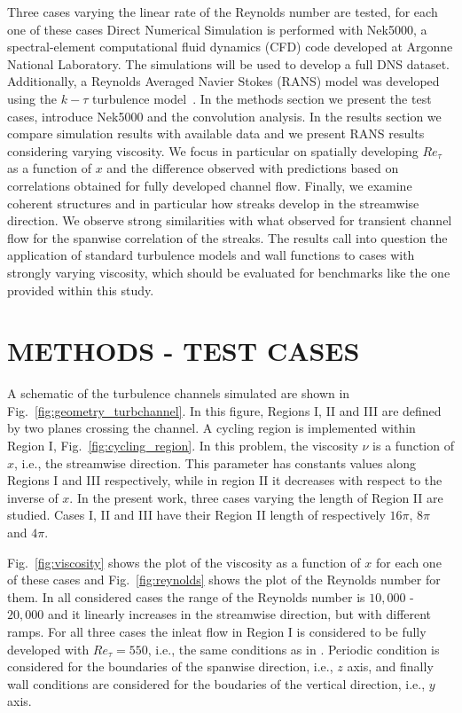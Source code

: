 \documentclass[twocolumn,10pt]{asme2e}
\begin{document}
Three cases varying the linear rate of the Reynolds number are tested, for each one of these cases Direct Numerical Simulation is performed with Nek5000, a spectral-element computational fluid dynamics (CFD) code developed at Argonne National Laboratory. The simulations will be used to develop a full DNS dataset. Additionally, a Reynolds Averaged Navier Stokes (RANS) model was developed using the \(k-\tau\) turbulence model~\cite{speziale1992}. In the methods section we present the test cases, introduce Nek5000 and the convolution analysis. In the results section we compare simulation results with available data and we present RANS results considering varying viscosity. We focus in particular on spatially developing $Re_{\tau}$ as a function of $x$ and the difference observed with predictions based on correlations obtained for fully developed channel flow. Finally, we examine coherent structures and in particular how streaks develop in the streamwise direction. We observe strong similarities with what observed for transient channel flow for the spanwise correlation of the streaks. The results call into question the application of standard turbulence models and wall functions to cases with strongly varying viscosity, which should be evaluated for benchmarks like the one provided within this study.


\section*{METHODS - TEST CASES}

A schematic of the turbulence channels simulated are shown in Fig.~\ref{fig:geometry_turbchannel}. In this figure, Regions I, II and III are defined by two planes crossing the channel. A cycling region is implemented within Region I, Fig.~\ref{fig:cycling_region}. In this problem, the viscosity \(\nu\) is a function of \(x\), i.e., the streamwise direction. This parameter has constants values along Regions I and III respectively, while in region II it decreases with respect to the inverse of \(x\). In the present work, three cases varying the length of Region II are studied. Cases I, II and III have their Region II length of respectively \(16\pi\), \(8\pi\) and \(4\pi\).

Fig.~\ref{fig:viscosity} shows the plot of the viscosity as a function of \(x\) for each one of these cases and Fig.~\ref{fig:reynolds} shows the plot of the Reynolds number for them. In all considered cases the range of the Reynolds number is \(10,000\) - \(20,000\) and it linearly increases in the streamwise direction, but with different ramps. For all three cases the inleat flow in Region I is considered to be fully developed with \(Re_{\tau}=550\), i.e., the same conditions as in \cite{hoyas2008}. Periodic condition is considered for the boundaries of the spanwise direction, i.e., \(z\) axis, and finally wall conditions are considered for the boudaries of the vertical direction, i.e., \(y\) axis.
\end{document}
